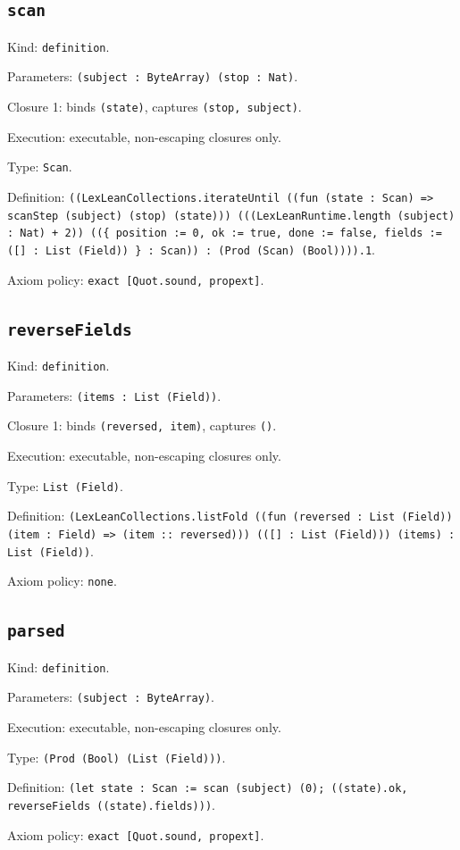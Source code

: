 \documentclass[11pt]{article}
\begin{document}
\subsection*{\texttt{scan}}
\noindent Kind: \texttt{definition}.\par
\noindent Parameters: \texttt{(subject : ByteArray) (stop : Nat)}.\par
\noindent Closure 1: binds \texttt{(state)}, captures \texttt{(stop, subject)}.\par
\noindent Execution: executable, non-escaping closures only.\par
\noindent Type: \texttt{Scan}.\par
\noindent Definition: \texttt{((LexLeanCollections.iterateUntil ((fun (state : Scan) => scanStep (subject) (stop) (state))) (((LexLeanRuntime.length (subject) : Nat) + 2)) ((\{ position := 0, ok := true, done := false, fields := ([] : List (Field)) \} : Scan)) : (Prod (Scan) (Bool)))).1}.\par
\noindent Axiom policy: \texttt{exact [Quot.sound, propext]}.\par
\subsection*{\texttt{reverseFields}}
\noindent Kind: \texttt{definition}.\par
\noindent Parameters: \texttt{(items : List (Field))}.\par
\noindent Closure 1: binds \texttt{(reversed, item)}, captures \texttt{()}.\par
\noindent Execution: executable, non-escaping closures only.\par
\noindent Type: \texttt{List (Field)}.\par
\noindent Definition: \texttt{(LexLeanCollections.listFold ((fun (reversed : List (Field)) (item : Field) => (item :: reversed))) (([] : List (Field))) (items) : List (Field))}.\par
\noindent Axiom policy: \texttt{none}.\par
\subsection*{\texttt{parsed}}
\noindent Kind: \texttt{definition}.\par
\noindent Parameters: \texttt{(subject : ByteArray)}.\par
\noindent Execution: executable, non-escaping closures only.\par
\noindent Type: \texttt{(Prod (Bool) (List (Field)))}.\par
\noindent Definition: \texttt{(let state : Scan := scan (subject) (0); ((state).ok, reverseFields ((state).fields)))}.\par
\noindent Axiom policy: \texttt{exact [Quot.sound, propext]}.\par
\end{document}

